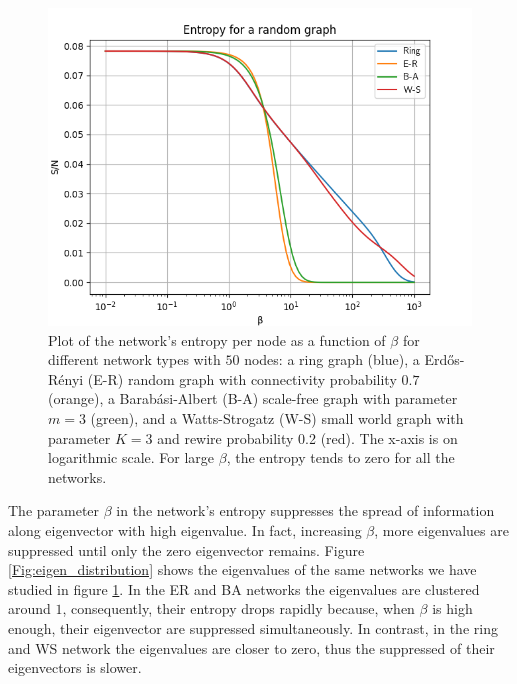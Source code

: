 \begin{figure}[ht!]
    \centering
    \includegraphics[width=0.80\linewidth]{image/random_graph.png}
    \caption{Plot of the network's entropy per node as a function of $\beta$ for different network types with $50$ nodes: a ring graph (blue), a Erd\H{o}s-Rényi (E-R) random graph with connectivity probability $0.7$ (orange), a Barab\'asi-Albert (B-A) scale-free graph with parameter $m=3$ (green), and a Watts-Strogatz (W-S) small world graph with parameter $K=3$ and rewire probability 0.2 (red). The x-axis is on logarithmic scale. For large $\beta$, the entropy tends to zero for all the networks.}
    \label{fig:ER-BA-WS}
\end{figure}


The parameter $\beta$ in the network's entropy suppresses the spread of information along eigenvector with high eigenvalue. In fact, increasing $\beta$, more eigenvalues are suppressed until only the zero eigenvector remains. 
Figure \ref{Fig:eigen_distribution} shows the eigenvalues of the same networks we have studied in figure \ref{fig:ER-BA-WS}. In the ER and BA networks the eigenvalues are clustered around $1$, consequently, their entropy drops rapidly because, when $\beta$ is high enough, their eigenvector are suppressed simultaneously. In contrast, in the ring and WS network the eigenvalues are closer to zero, thus   the suppressed of their eigenvectors is slower.

